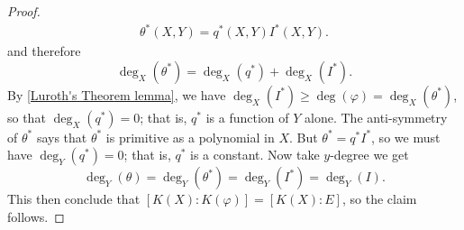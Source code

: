 \begin{proof}
\begin{align*}
\theta^*(X,Y)=q^*(X,Y)I^*(X,Y).
\end{align*}
and therefore
\[\deg_X(\theta^*)=\deg_X(q^*)+\deg_X(I^*).\]
By \cref{Luroth's Theorem lemma}, we have $\deg_X(I^*)\geq\deg(\varphi)=\deg_X(\theta^*)$, so that $\deg_X(q^*)=0$; that is, $q^*$ is a function of $Y$ alone. The anti-symmetry of $\theta^*$ says that $\theta^*$ is primitive as a polynomial in $X$. But $\theta^*=q^*I^*$, so we must have $\deg_Y(q^*)=0$; that is, $q^*$ is a constant. Now take $y$-degree we get
\[\deg_Y(\theta)=\deg_Y(\theta^*)=\deg_Y(I^*)=\deg_Y(I).\]
This then conclude that $[K(X):K(\varphi)]=[K(X):E]$, so the claim follows.
\end{proof}